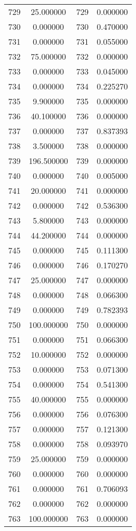 \documentclass[12pt]{article}
\begin{document}
\begin{longtable}{@{}cccc@{}}
729 & 25.000000 & 729 & 0.000000 \\
730 & 0.000000 & 730 & 0.470000 \\
731 & 0.000000 & 731 & 0.055000 \\
732 & 75.000000 & 732 & 0.000000 \\
733 & 0.000000 & 733 & 0.045000 \\
734 & 0.000000 & 734 & 0.225270 \\
735 & 9.900000 & 735 & 0.000000 \\
736 & 40.100000 & 736 & 0.000000 \\
737 & 0.000000 & 737 & 0.837393 \\
738 & 3.500000 & 738 & 0.000000 \\
739 & 196.500000 & 739 & 0.000000 \\
740 & 0.000000 & 740 & 0.005000 \\
741 & 20.000000 & 741 & 0.000000 \\
742 & 0.000000 & 742 & 0.536300 \\
743 & 5.800000 & 743 & 0.000000 \\
744 & 44.200000 & 744 & 0.000000 \\
745 & 0.000000 & 745 & 0.111300 \\
746 & 0.000000 & 746 & 0.170270 \\
747 & 25.000000 & 747 & 0.000000 \\
748 & 0.000000 & 748 & 0.066300 \\
749 & 0.000000 & 749 & 0.782393 \\
750 & 100.000000 & 750 & 0.000000 \\
751 & 0.000000 & 751 & 0.066300 \\
752 & 10.000000 & 752 & 0.000000 \\
753 & 0.000000 & 753 & 0.071300 \\
754 & 0.000000 & 754 & 0.541300 \\
755 & 40.000000 & 755 & 0.000000 \\
756 & 0.000000 & 756 & 0.076300 \\
757 & 0.000000 & 757 & 0.121300 \\
758 & 0.000000 & 758 & 0.093970 \\
759 & 25.000000 & 759 & 0.000000 \\
760 & 0.000000 & 760 & 0.000000 \\
761 & 0.000000 & 761 & 0.706093 \\
762 & 0.000000 & 762 & 0.000000 \\
763 & 100.000000 & 763 & 0.000000 \\

\end{longtable}
\end{document}
